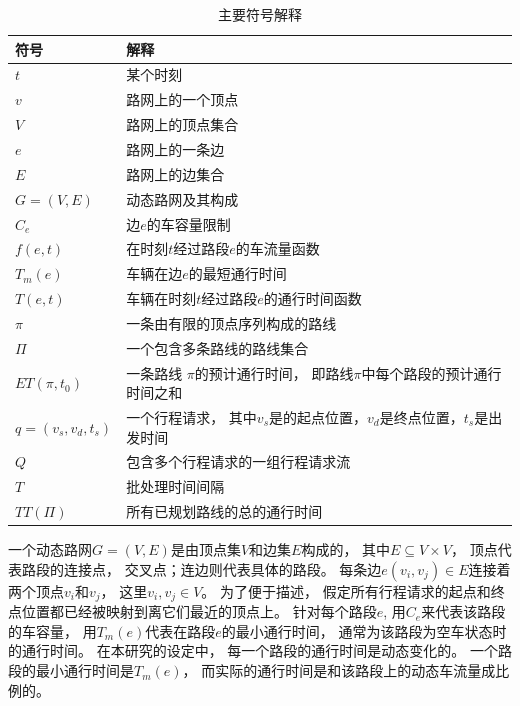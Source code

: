 \begin{table}[!ht]
    \caption{主要符号解释}\label{route_tab:notation}
    \begin{tabular}{ll}
        \toprule
		\bfseries 符号 & \bfseries 解释 \\
        \midrule
        $t$ & 某个时刻\\
        $v$ & 路网上的一个顶点 \\
        $V$ & 路网上的顶点集合 \\
        $e$ & 路网上的一条边 \\
        $E$ & 路网上的边集合 \\
        $G=(V, E)$ & 动态路网及其构成 \\
        $C_e$ & 边$e$的车容量限制 \\
        $f(e, t)$ & 在时刻$t$经过路段$e$的车流量函数 \\
        $T_m(e)$ & 车辆在边$e$的最短通行时间 \\
        $T(e, t)$ & 车辆在时刻$t$经过路段$e$的通行时间函数 \\
        $\pi$ & 一条由有限的顶点序列构成的路线 \\
        $\Pi$ & 一个包含多条路线的路线集合 \\
        $ET(\pi, t_0)$&一条路线 $\pi$的预计通行时间， 即路线$\pi$中每个路段的预计通行时间之和\\
        $q=(v_s, v_d, t_s)$ & 一个行程请求， 其中$v_s$是的起点位置，$v_d$是终点位置，$t_s$是出发时间\\
        $Q$ & 包含多个行程请求的一组行程请求流\\
        $T$ & 批处理时间间隔\\
        $TT (\Pi)$ & 所有已规划路线的总的通行时间\\
        \bottomrule
    \end{tabular}
\end{table}

\begin{definition}[动态路网]
    一个动态路网$G=(V,E)$是由顶点集$V$和边集$E$构成的， 其中$E\subseteq V\times V$， 顶点代表路段的连接点， 交叉点；连边则代表具体的路段。 每条边$e(v_i,v_j)\in E$连接着两个顶点$v_i$和$v_j$， 这里$v_i,v_j \in V $。 为了便于描述， 假定所有行程请求的起点和终点位置都已经被映射到离它们最近的顶点上。 针对每个路段$e$, 用$C_e$来代表该路段的车容量， 用$T_m(e)$代表在路段$e$的最小通行时间， 通常为该路段为空车状态时的通行时间。 在本研究的设定中， 每一个路段的通行时间是动态变化的。 一个路段的最小通行时间是$T_m(e)$， 而实际的通行时间是和该路段上的动态车流量成比例的。
\end{definition}

